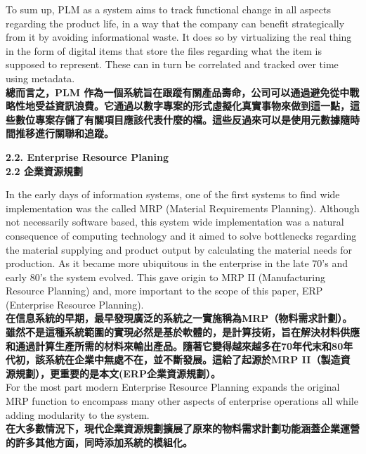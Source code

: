 \documentclass[24pt]{article} %
\begin{document}
To sum up, PLM as a system aims to track functional change in all aspects regarding the product life, in a way that the company can benefit strategically from it by avoiding
informational waste. It does so by virtualizing the real thing in the form of digital items that store the files regarding what the item is supposed to represent. These can in turn be
correlated and tracked over time using metadata.\\

\textbf{總而言之，PLM 作為一個系統旨在跟蹤有關產品壽命，公司可以通過避免從中戰略性地受益資訊浪費。它通過以數字專案的形式虛擬化真實事物來做到這一點，這些數位專案存儲了有關項目應該代表什麼的檔。這些反過來可以是使用元數據隨時間推移進行關聯和追蹤。}\\

\begin{center}
\Large \textbf{2.2. Enterprise Resource Planing}\\

\Large \textbf{2.2 企業資源規劃}\\
\end{center}
In the early days of information systems, one of the first systems to find wide implementation was the called MRP (Material Requirements Planning). Although not necessarily software based, this system wide implementation was a natural consequence of computing technology and it aimed to solve bottlenecks regarding the material supplying and
product output by calculating the material needs for production. As it became more ubiquitous in the enterprise in the late 70’s and early 80’s the system evolved. This gave
origin to MRP II (Manufacturing Resource Planning) and, more important to the scope of this paper, ERP (Enterprise Resource Planning).\\

\textbf{在信息系統的早期，最早發現廣泛的系統之一實施稱為MRP（物料需求計劃）。雖然不是這種系統範圍的實現必然是基於軟體的，是計算技術，旨在解決材料供應和通過計算生產所需的材料來輸出產品。隨著它變得越來越多在70年代末和80年代初，該系統在企業中無處不在，並不斷發展。這給了起源於MRP II（製造資源規劃），更重要的是本文(ERP企業資源規劃）。}\\

For the most part modern Enterprise Resource Planning expands the original MRP function to encompass many other aspects of enterprise operations all while adding modularity to the system.\\

\textbf{在大多數情況下，現代企業資源規劃擴展了原來的物料需求計劃功能涵蓋企業運營的許多其他方面，同時添加系統的模組化。}\\
\end{document}
